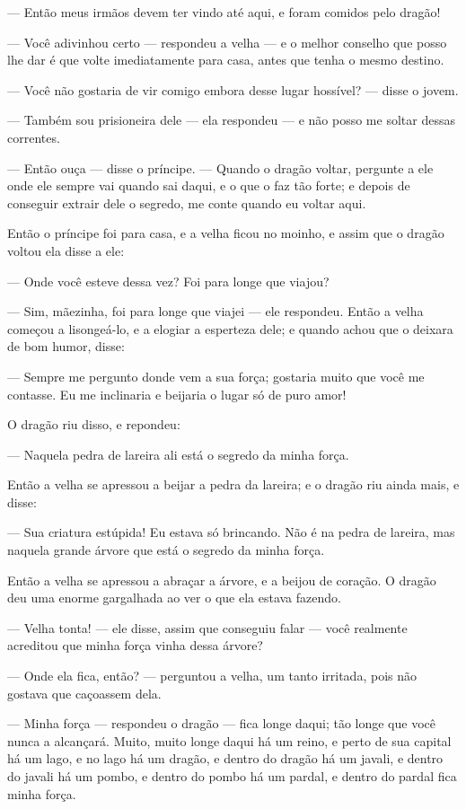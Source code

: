 — Então meus irmãos devem ter vindo até aqui, e foram comidos pelo
dragão!

— Você adivinhou certo — respondeu a velha — e o melhor conselho que
posso lhe dar é que volte imediatamente para casa, antes que tenha o
mesmo destino. 

— Você não gostaria de vir comigo embora desse lugar hossível? — disse
o jovem.

— Também sou prisioneira dele — ela respondeu — e não posso me soltar
dessas correntes. 

— Então ouça — disse o príncipe. — Quando o dragão voltar, pergunte a
ele onde ele sempre vai quando sai daqui, e o que o faz tão forte; e
depois de conseguir extrair dele o segredo, me conte quando eu voltar
aqui.

Então o príncipe foi para casa, e a velha ficou no moinho, e assim que
o dragão voltou ela disse a ele:

— Onde você esteve dessa vez? Foi para longe que viajou?

— Sim, mãezinha, foi para longe que viajei — ele respondeu. Então a
velha começou a lisongeá-lo, e a elogiar a esperteza dele; e quando
achou que o deixara de bom humor, disse:

— Sempre me pergunto donde vem a sua força; gostaria muito que você me
contasse. Eu me inclinaria e beijaria o lugar só de puro amor! 

O dragão riu disso, e repondeu:

— Naquela pedra de lareira ali está o segredo da minha força.

Então a velha se apressou a beijar a pedra da lareira; e o dragão riu
ainda mais, e disse: 

— Sua criatura estúpida! Eu estava só brincando. Não é na pedra de
lareira, mas naquela grande árvore que está o segredo da minha força.


Então a velha se apressou a abraçar a árvore, e a beijou de coração. O
dragão deu uma enorme gargalhada ao ver o que ela estava fazendo.

— Velha tonta! — ele disse, assim que conseguiu falar — você realmente
acreditou que minha força vinha dessa árvore?

— Onde ela fica, então? — perguntou a velha, um tanto irritada, pois
não gostava que caçoassem dela. 

— Minha força — respondeu o dragão — fica longe daqui; tão longe que
você nunca a alcançará. Muito, muito longe daqui há um reino, e perto
de sua capital há um lago, e no lago há um dragão, e dentro do dragão
há um javali, e dentro do javali há um pombo, e dentro do pombo há um
pardal, e dentro do pardal fica minha força. 

